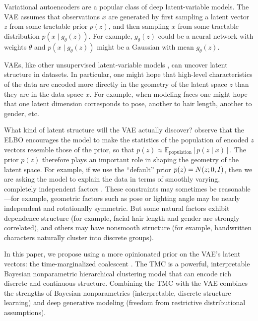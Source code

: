 Variational autoencoders \citep[VAEs; ][]{kingma2013autoencoding,rezende2014stochastic} are a popular class of deep latent-variable models. The VAE assumes that observations $x$ are generated by first sampling a latent vector $z$ from some tractable prior $p(z)$, and then sampling $x$ from some tractable distribution $p(x\mid g_\theta(z))$.
For example, $g_\theta(z)$ could be a neural network with weights $\theta$ and $p(x\mid g_\theta(z))$ might be a Gaussian with mean $g_\theta(z)$.

VAEs, like other unsupervised latent-variable models \citep[e.g.; ][]{tipping1999probabilistic,blei2003latent}, can uncover latent structure in datasets.
In particular, one might hope that high-level characteristics of the data are encoded more directly in the geometry of the latent space $z$ than they are in the data space $x$. For example, when modeling faces one might hope that one latent dimension corresponds to pose, another to hair length, another to gender, etc. 

What kind of latent structure will the VAE actually discover?
\citet{hoffman2016elbo} observe that the ELBO encourages the model to make the statistics of the population of encoded $z$ vectors resemble those of the prior, so that $p(z)\approx\mathbb{E}_\mathrm{population}[p(z\mid x)]$.
The prior $p(z)$ therefore plays an important role in shaping the geometry of the latent space.
For example, if we use the ``default'' prior $p(z)=N(z; 0, I)$, then we are asking the model to explain the data in terms of smoothly varying, completely independent factors \citep{burgess2018understanding}. These constraints may sometimes be reasonable---for example, geometric factors such as pose or lighting angle may be nearly independent and rotationally symmetric. But some natural factors exhibit dependence structure (for example, facial hair length and gender are strongly correlated), and others may have nonsmooth structure (for example, handwritten characters naturally cluster into discrete groups).

In this paper, we propose using a more opinionated prior on the VAE's latent vectors: the time-marginalized coalescent \citep[TMC; ][]{boyles2012time}.
The TMC is a powerful, interpretable Bayesian nonparametric hierarchical clustering model that can encode rich discrete and continuous structure.
Combining the TMC with the VAE combines the strengths of Bayesian nonparametrics (interpretable, discrete structure learning) and deep generative modeling (freedom from restrictive distributional assumptions).


